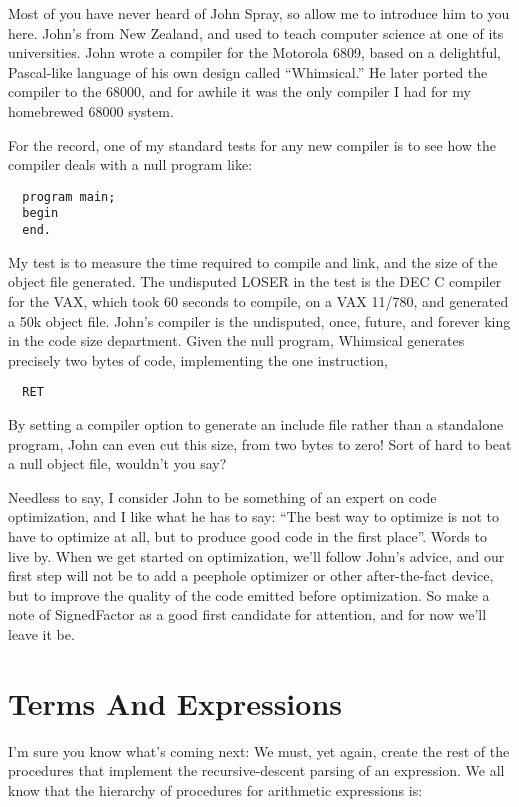 Most of you have never heard of John Spray, so allow me to introduce him to you here. John's from New Zealand, and used to teach computer science at one of its universities. John wrote a compiler for the Motorola 6809, based on a delightful, Pascal-like language of his own design called ``Whimsical.''  He later ported the compiler to the 68000, and for awhile it was the only compiler I had for my homebrewed 68000 system.

For the record, one of my standard tests for any new compiler is to see how the compiler deals with a null program like:

\begin{verbatim}
  program main;
  begin
  end.
\end{verbatim}

My test is to measure the time required to compile and link, and the size of the object file generated. The undisputed LOSER in the test is the DEC C compiler for the VAX, which took 60 seconds to compile, on a VAX 11/780, and generated a 50k object file. John's compiler is the undisputed, once, future, and forever king in the code size department. Given the null program, Whimsical generates precisely two bytes of code, implementing the one instruction,

\begin{verbatim}
  RET
\end{verbatim}

By setting a compiler option to generate an include file rather than a standalone program, John can even cut this size, from two bytes to zero!  Sort of hard to beat a null object file, wouldn't you say?

Needless to say, I consider John to be something of an expert on code optimization, and I like what he has to say: ``The best way to optimize is not to have to optimize at all, but to produce good code in the first place''. Words to live by. When we get started on optimization, we'll follow John's advice, and our first step will not be to add a peephole optimizer or other after-the-fact device, but to improve the quality of the code emitted before optimization. So make a note of SignedFactor as a good first candidate for attention, and for now we'll leave it be.

\section{Terms And Expressions}

I'm sure you know what's coming next: We must, yet again, create the rest of the procedures that implement the recursive-descent parsing of an expression. We all know that the hierarchy of procedures for arithmetic expressions is:

